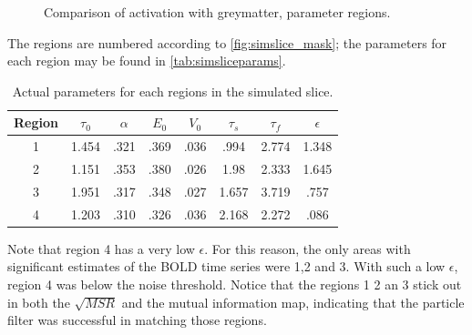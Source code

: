 \begin{figure}[H]
\caption{Comparison of activation with greymatter, parameter regions.}
\label{fig:simslice_hm}
\end{figure}

The regions are numbered according to \autoref{fig:simslice_mask}; the parameters
for each region may be found in \autoref{tab:simsliceparams}. 

\begin{table}[t]
\centering
\begin{tabular}{|c |c | c | c | c | c | c | c |}
\hline 
Region & $\tau_0$ & $\alpha$ & $E_0$    & $V_0$    & $\tau_s$ & $\tau_f$ & $\epsilon$  \\
\hline 
1 & 1.454& .321& .369& .036& .994& 2.774& 1.348\\
2 &1.151& .353& .380& .026& 1.98& 2.333& 1.645 \\
3 &1.951& .317& .348& .027& 1.657& 3.719& .757 \\
4 &1.203 & .310& .326& .036& 2.168& 2.272& .086\\
\hline
\end{tabular}
\caption{Actual parameters for each regions in the simulated slice.}
\label{tab:simsliceparams} 
\end{table}

Note that region 4 has a very low $\epsilon$. For this reason, the only areas
with significant estimates of the BOLD time series were 1,2 and 3. With
such a low $\epsilon$, region 4 was below the noise threshold. Notice that the
regions 1 2 an 3 stick out in both the $\sqrt{MSR}$ and the mutual information
map, indicating that the
particle filter was successful in matching those regions. 

